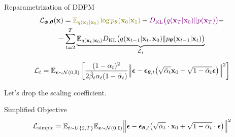 \documentclass{beamer}
\renewcommand{\eqpause}{}
\begin{document}
\begin{frame}{Reparametrization of DDPM}
    \begin{multline*}
        \cL_{\bphi, \btheta}(\bx) =  {\color{olive}\bbE_{q(\bx_1 | \bx_0)} \log \pt(\bx_0 | \bx_1)} - {\color{violet}\KL\bigl(q(\bx_T | \bx_0) \| p(\bx_T)\bigr)} - \\
        - \sum_{t=2}^T \underbrace{ \bbE_{q(\bx_t | \bx_0)} \KL \bigl(q(\bx_{t-1} | \bx_t, \bx_0) \| \pt(\bx_{t-1} | \bx_t)\bigr)}_{\cL_t}
    \end{multline*}
    \eqpause
    \vspace{-0.3cm}
    \[
        \mathcal{L}_t  = \mathbb{E}_{\boldsymbol{\epsilon} \sim \mathcal{N}(0, \mathbf{I})} \left[ \frac{(1 - \alpha_t)^2}{2\tilde{\beta}_t \alpha_t (1 - \bar{\alpha}_t)} \Bigl\| \boldsymbol{\epsilon} - \boldsymbol{\epsilon}_{\boldsymbol{\theta}, t}\bigl( \sqrt{\bar{\alpha}_t} \mathbf{x}_0 + \sqrt{1 - \bar{\alpha}_t} \boldsymbol{\epsilon}\bigr) \Bigr\|^2 \right]
    \]
    \eqpause
    Let's drop the scaling coefficient.
    \begin{block}{Simplified Objective}
        \vspace{-0.3cm}
        \[
             \mathcal{L}_{\text{simple}} = \mathbb{E}_{t \sim U\{2, T\}} \mathbb{E}_{\boldsymbol{\epsilon} \sim \mathcal{N}(0, \mathbf{I})} \Bigl\| \boldsymbol{\epsilon} - \boldsymbol{\epsilon}_{\boldsymbol{\theta}, t}\bigl( \sqrt{\bar{\alpha}_t} \cdot \mathbf{x}_0 + \sqrt{1 - \bar{\alpha}_t} \cdot \boldsymbol{\epsilon}\bigr) \Bigr\|^2 
        \]
    \end{block}
\end{frame}
\end{document}
